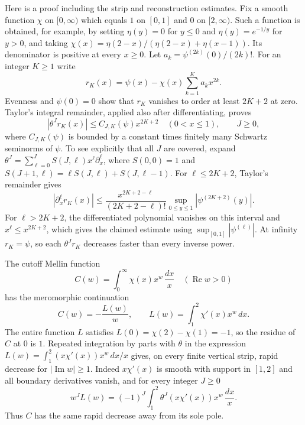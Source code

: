 Here is a proof including the strip and reconstruction estimates.
Fix a smooth function $\chi$ on $[0,\infty)$ which equals $1$
on $[0,1]$ and $0$ on $[2,\infty)$. Such a function is obtained,
for example, by setting $\eta(y)=0$ for $y\leq0$ and
$\eta(y)=e^{-1/y}$ for $y>0$, and taking
$\chi(x)=\eta(2-x)/(\eta(2-x)+\eta(x-1))$. Its denominator is
positive at every $x\geq0$. Let
$a_k=\psi^{(2k)}(0)/(2k)!$. For an integer $K\geq1$ write
\[
 r_K(x)=\psi(x)-\chi(x)\sum_{k=1}^K a_kx^{2k}.
\]
Evenness and $\psi(0)=0$ show that $r_K$ vanishes to order
at least $2K+2$ at zero. Taylor's integral remainder, applied
also after differentiating, proves
\[
 |\theta^Jr_K(x)|\leq C_{J,K}(\psi)x^{2K+2}
 \quad(0<x\leq1),\qquad J\geq0,
\]
where $C_{J,K}(\psi)$ is bounded by a constant times finitely
many Schwartz seminorms of $\psi$. To see explicitly that all
$J$ are covered, expand
$\theta^J=\sum_{\ell=0}^J S(J,\ell)x^\ell\partial_x^\ell$,
where $S(0,0)=1$ and
$S(J+1,\ell)=\ell S(J,\ell)+S(J,\ell-1)$. For
$\ell\leq2K+2$, Taylor's remainder gives
\[
 |\partial_x^\ell r_K(x)|
 \leq\frac{x^{2K+2-\ell}}{(2K+2-\ell)!}
              \sup_{0\leq y\leq1}|\psi^{(2K+2)}(y)|.
\]
For $\ell>2K+2$, the differentiated polynomial vanishes on
this interval and $x^\ell\leq x^{2K+2}$, which gives the
claimed estimate using $\sup_{[0,1]}|\psi^{(\ell)}|$.
At infinity $r_K=\psi$, so each $\theta^Jr_K$ decreases
faster than every inverse power.

The cutoff Mellin function
\[
 C(w)=\int_0^\infty\chi(x)x^w\,\frac{dx}{x}
       \quad(\operatorname{Re}w>0)
\]
has the meromorphic continuation
\begin{equation}\label{eq:cq-Mellin-cutoff}
 C(w)=-\frac{L(w)}{w},\qquad
 L(w)=\int_1^2\chi'(x)x^w\,dx.
\end{equation}
The entire function $L$ satisfies $L(0)=\chi(2)-\chi(1)=-1$,
so the residue of $C$ at $0$ is $1$. Repeated integration by
parts with $\theta$ in the expression
$L(w)=\int_1^2(x\chi'(x))x^w\,dx/x$ gives, on every finite
vertical strip, rapid decrease for $|\operatorname{Im}w|\geq1$.
Indeed $x\chi'(x)$ is smooth with support in $[1,2]$ and all
boundary derivatives vanish, and for every integer $J\geq0$
\[
 w^JL(w)=(-1)^J\int_1^2
       \theta^J(x\chi'(x))x^w\,\frac{dx}{x}.
\]
Thus $C$ has the same rapid decrease away from its sole pole.


